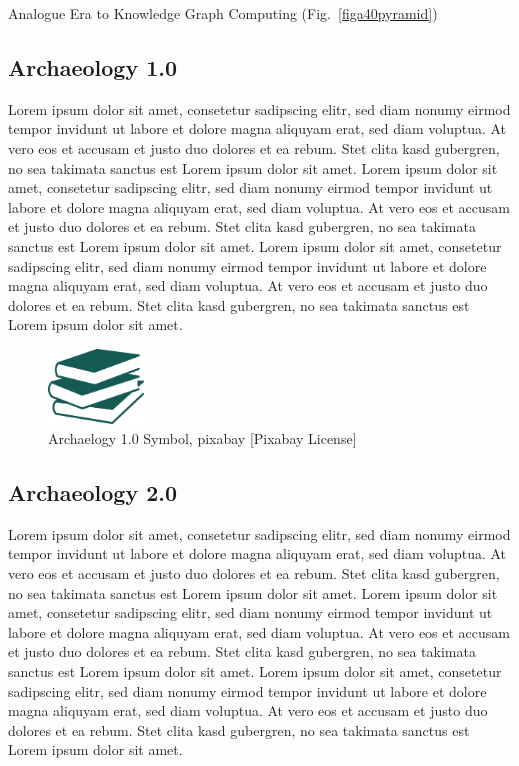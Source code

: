 \documentclass[twocolumn]{autart}
\begin{document}
Analogue Era to Knowledge Graph Computing (Fig.~\ref{figa40pyramid})

\subsection{Archaeology 1.0}

Lorem ipsum dolor sit amet, consetetur sadipscing elitr, sed diam nonumy eirmod tempor invidunt ut labore et dolore magna aliquyam erat, sed diam voluptua. At vero eos et accusam et justo duo dolores et ea rebum. Stet clita kasd gubergren, no sea takimata sanctus est Lorem ipsum dolor sit amet. Lorem ipsum dolor sit amet, consetetur sadipscing elitr, sed diam nonumy eirmod tempor invidunt ut labore et dolore magna aliquyam erat, sed diam voluptua. At vero eos et accusam et justo duo dolores et ea rebum. Stet clita kasd gubergren, no sea takimata sanctus est Lorem ipsum dolor sit amet. Lorem ipsum dolor sit amet, consetetur sadipscing elitr, sed diam nonumy eirmod tempor invidunt ut labore et dolore magna aliquyam erat, sed diam voluptua. At vero eos et accusam et justo duo dolores et ea rebum. Stet clita kasd gubergren, no sea takimata sanctus est Lorem ipsum dolor sit amet.

\begin{figure}[!htb]
\begin{center}
\includegraphics[height=2cm]{a10.png}    %
\caption{Archaelogy 1.0 Symbol, pixabay [Pixabay License]}  %
\label{figa10symbol}                                 %
\end{center}                                 %
\end{figure}

\subsection{Archaeology 2.0}

Lorem ipsum dolor sit amet, consetetur sadipscing elitr, sed diam nonumy eirmod tempor invidunt ut labore et dolore magna aliquyam erat, sed diam voluptua. At vero eos et accusam et justo duo dolores et ea rebum. Stet clita kasd gubergren, no sea takimata sanctus est Lorem ipsum dolor sit amet. Lorem ipsum dolor sit amet, consetetur sadipscing elitr, sed diam nonumy eirmod tempor invidunt ut labore et dolore magna aliquyam erat, sed diam voluptua. At vero eos et accusam et justo duo dolores et ea rebum. Stet clita kasd gubergren, no sea takimata sanctus est Lorem ipsum dolor sit amet. Lorem ipsum dolor sit amet, consetetur sadipscing elitr, sed diam nonumy eirmod tempor invidunt ut labore et dolore magna aliquyam erat, sed diam voluptua. At vero eos et accusam et justo duo dolores et ea rebum. Stet clita kasd gubergren, no sea takimata sanctus est Lorem ipsum dolor sit amet.
\end{document}
